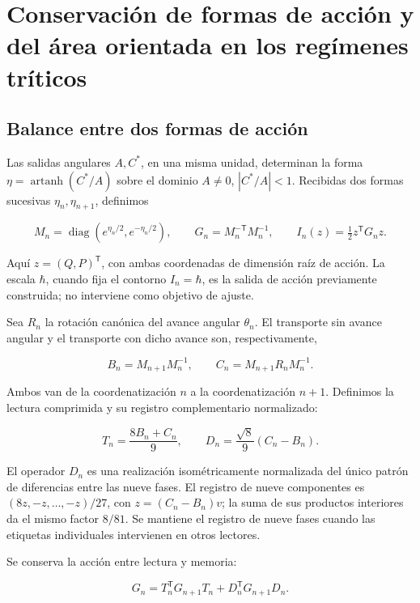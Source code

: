 \section{Conservación de formas de acción y del área orientada en los regímenes tríticos}
\label{nuclear:8}
\subsection{Balance entre dos formas de acción}

Las salidas angulares \(A,C^*\), en una misma unidad, determinan la forma \(\eta=\operatorname{artanh}(C^*/A)\) sobre el dominio \(A\ne0\), \(|C^*/A|<1\). Recibidas dos formas sucesivas \(\eta_n,\eta_{n+1}\), definimos

\[
M_n=\operatorname{diag}(e^{\eta_n/2},e^{-\eta_n/2}),\qquad
G_n=M_n^{-\mathsf T}M_n^{-1},\qquad
I_n(z)=\tfrac12z^\mathsf TG_nz.
\]

Aquí \(z=(Q,P)^\mathsf T\), con ambas coordenadas de dimensión raíz de acción. La escala \(\hbar\), cuando fija el contorno \(I_n=\hbar\), es la salida de acción previamente construida; no interviene como objetivo de ajuste.

Sea \(R_n\) la rotación canónica del avance angular \(\theta_n\). El transporte sin avance angular y el transporte con dicho avance son, respectivamente,

\begin{equation}
B_n=M_{n+1}M_n^{-1},\qquad
C_n=M_{n+1}R_nM_n^{-1}.
\label{nuc08:eq:1}
\end{equation}

Ambos van de la coordenatización \(n\) a la coordenatización \(n+1\). Definimos la lectura comprimida y su registro complementario normalizado:

\begin{equation}
T_n=\frac{8B_n+C_n}{9},\qquad
D_n=\frac{\sqrt8}{9}(C_n-B_n).
\label{nuc08:eq:2}
\end{equation}

El operador \(D_n\) es una realización isométricamente normalizada del único patrón de diferencias entre las nueve fases. El registro de nueve componentes es \((8z,-z,\ldots,-z)/27\), con \(z=(C_n-B_n)v\); la suma de sus productos interiores da el mismo factor \(8/81\). Se mantiene el registro de nueve fases cuando las etiquetas individuales intervienen en otros lectores.

\begin{theorem}
Se conserva la acción entre lectura y memoria:

\begin{equation}
\boxed{G_n=T_n^\mathsf TG_{n+1}T_n+D_n^\mathsf TG_{n+1}D_n.}
\label{nuc08:eq:3}
\end{equation}
\end{theorem}


